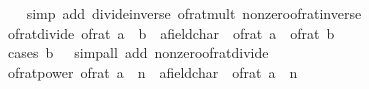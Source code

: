 \begin{isabellebody}
%
\isadelimproof
\ \ %
\endisadelimproof
%
\isatagproof
{}\isamarkupfalse%
\ {\isacharparenleft}{\kern0pt}simp\ add{\isacharcolon}{\kern0pt}\ divide{\isacharunderscore}{\kern0pt}inverse\ of{\isacharunderscore}{\kern0pt}rat{\isacharunderscore}{\kern0pt}mult\ nonzero{\isacharunderscore}{\kern0pt}of{\isacharunderscore}{\kern0pt}rat{\isacharunderscore}{\kern0pt}inverse{\isacharparenright}{\kern0pt}%
\endisatagproof
{\isafoldproof}%
%
\isadelimproof
\isanewline
%
\endisadelimproof
\isanewline
{}\isamarkupfalse%
\ of{\isacharunderscore}{\kern0pt}rat{\isacharunderscore}{\kern0pt}divide{\isacharcolon}{\kern0pt}\ {\isachardoublequoteopen}{\isacharparenleft}{\kern0pt}of{\isacharunderscore}{\kern0pt}rat\ {\isacharparenleft}{\kern0pt}a\ {\isacharslash}{\kern0pt}\ b{\isacharparenright}{\kern0pt}\ {\isacharcolon}{\kern0pt}{\isacharcolon}{\kern0pt}\ {\isacharprime}{\kern0pt}a{\isacharcolon}{\kern0pt}{\isacharcolon}{\kern0pt}field{\isacharunderscore}{\kern0pt}char{\isacharunderscore}{\kern0pt}{}{\isacharparenright}{\kern0pt}\ {\isacharequal}{\kern0pt}\ of{\isacharunderscore}{\kern0pt}rat\ a\ {\isacharslash}{\kern0pt}\ of{\isacharunderscore}{\kern0pt}rat\ b{\isachardoublequoteclose}\isanewline
%
\isadelimproof
\ \ %
\endisadelimproof
%
\isatagproof
{}\isamarkupfalse%
\ {\isacharparenleft}{\kern0pt}cases\ {\isachardoublequoteopen}b\ {\isacharequal}{\kern0pt}\ {}{\isachardoublequoteclose}{\isacharparenright}{\kern0pt}\ {\isacharparenleft}{\kern0pt}simp{\isacharunderscore}{\kern0pt}all\ add{\isacharcolon}{\kern0pt}\ nonzero{\isacharunderscore}{\kern0pt}of{\isacharunderscore}{\kern0pt}rat{\isacharunderscore}{\kern0pt}divide{\isacharparenright}{\kern0pt}%
\endisatagproof
{\isafoldproof}%
%
\isadelimproof
\isanewline
%
\endisadelimproof
\isanewline
{}\isamarkupfalse%
\ of{\isacharunderscore}{\kern0pt}rat{\isacharunderscore}{\kern0pt}power{\isacharcolon}{\kern0pt}\ {\isachardoublequoteopen}{\isacharparenleft}{\kern0pt}of{\isacharunderscore}{\kern0pt}rat\ {\isacharparenleft}{\kern0pt}a\ {\isacharcircum}{\kern0pt}\ n{\isacharparenright}{\kern0pt}\ {\isacharcolon}{\kern0pt}{\isacharcolon}{\kern0pt}\ {\isacharprime}{\kern0pt}a{\isacharcolon}{\kern0pt}{\isacharcolon}{\kern0pt}field{\isacharunderscore}{\kern0pt}char{\isacharunderscore}{\kern0pt}{}{\isacharparenright}{\kern0pt}\ {\isacharequal}{\kern0pt}\ of{\isacharunderscore}{\kern0pt}rat\ a\ {\isacharcircum}{\kern0pt}\ n{\isachardoublequoteclose}\isanewline
%
\isadelimproof
\ \ %
\endisadelimproof
%
\isatagproof
{}\isamarkupfalse%

\end{isabellebody}

